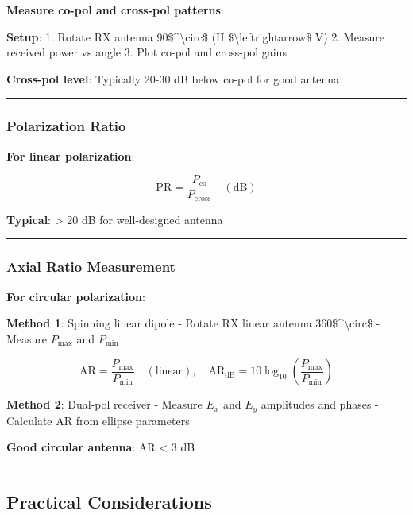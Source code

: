 \textbf{Measure co-pol and cross-pol patterns}:

\textbf{Setup}: 1. Rotate RX antenna 90\$\^{}\textbackslash circ\$ (H
\$\textbackslash leftrightarrow\$ V) 2. Measure received power vs angle
3. Plot co-pol and cross-pol gains

\textbf{Cross-pol level}: Typically 20-30 dB below co-pol for good
antenna

\begin{center}\rule{0.5\linewidth}{0.5pt}\end{center}

\subsubsection{Polarization Ratio}\label{polarization-ratio}

\textbf{For linear polarization}:

\[
\text{PR} = \frac{P_{\text{co}}}{P_{\text{cross}}} \quad (\text{dB})
\]

\textbf{Typical}: \textgreater{} 20 dB for well-designed antenna

\begin{center}\rule{0.5\linewidth}{0.5pt}\end{center}

\subsubsection{Axial Ratio Measurement}\label{axial-ratio-measurement}

\textbf{For circular polarization}:

\textbf{Method 1}: Spinning linear dipole - Rotate RX linear antenna
360\$\^{}\textbackslash circ\$ - Measure \(P_{\text{max}}\) and
\(P_{\text{min}}\)

\[
\text{AR} = \frac{P_{\text{max}}}{P_{\text{min}}} \quad (\text{linear}), \quad \text{AR}_{\text{dB}} = 10\log_{10}\left(\frac{P_{\text{max}}}{P_{\text{min}}}\right)
\]

\textbf{Method 2}: Dual-pol receiver - Measure \(E_x\) and \(E_y\)
amplitudes and phases - Calculate AR from ellipse parameters

\textbf{Good circular antenna}: AR \textless{} 3 dB

\begin{center}\rule{0.5\linewidth}{0.5pt}\end{center}

\subsection{Practical Considerations}\label{practical-considerations}

